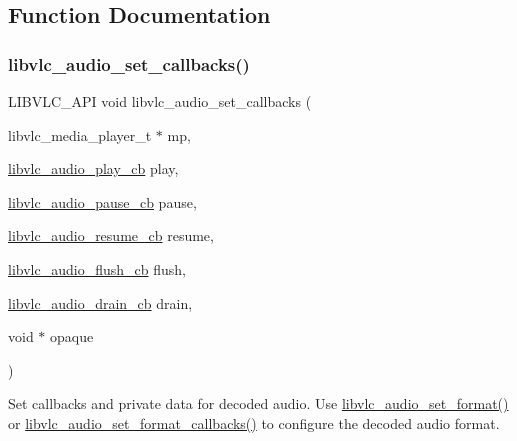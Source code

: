 \subsection{Function Documentation}
\mbox{\label{group__libvlc__media__player_gaac7abb1d8be3f60bb9da20c000703790}} 
\subsubsection{\texorpdfstring{libvlc\+\_\+audio\+\_\+set\+\_\+callbacks()}{libvlc\_audio\_set\_callbacks()}}
{\footnotesize\ttfamily L\+I\+B\+V\+L\+C\+\_\+\+A\+PI void libvlc\+\_\+audio\+\_\+set\+\_\+callbacks (\begin{DoxyParamCaption}\item[{libvlc\+\_\+media\+\_\+player\+\_\+t $\ast$}]{mp,  }\item[{\hyperlink{group__libvlc__media__player_ga9a242251d11378ecdc43b8ef0cc0254e}{libvlc\+\_\+audio\+\_\+play\+\_\+cb}}]{play,  }\item[{\hyperlink{group__libvlc__media__player_gaac6c92b1a3d331c73fbbba11140fca4e}{libvlc\+\_\+audio\+\_\+pause\+\_\+cb}}]{pause,  }\item[{\hyperlink{group__libvlc__media__player_ga4c61b5ee287be1aa176882cef004e4ca}{libvlc\+\_\+audio\+\_\+resume\+\_\+cb}}]{resume,  }\item[{\hyperlink{group__libvlc__media__player_ga7ab971890ddbf306331989d60b88c171}{libvlc\+\_\+audio\+\_\+flush\+\_\+cb}}]{flush,  }\item[{\hyperlink{group__libvlc__media__player_gaf25ee69cefcb19ae1a1751b7ba73cf41}{libvlc\+\_\+audio\+\_\+drain\+\_\+cb}}]{drain,  }\item[{void $\ast$}]{opaque }\end{DoxyParamCaption})}

Set callbacks and private data for decoded audio. Use \hyperlink{group__libvlc__media__player_gaf7af18f5f09e34234e5f1bf4681dfe43}{libvlc\+\_\+audio\+\_\+set\+\_\+format()} or \hyperlink{group__libvlc__media__player_gae1c8bcbd10157da11331e46d30ecd058}{libvlc\+\_\+audio\+\_\+set\+\_\+format\+\_\+callbacks()} to configure the decoded audio format.


